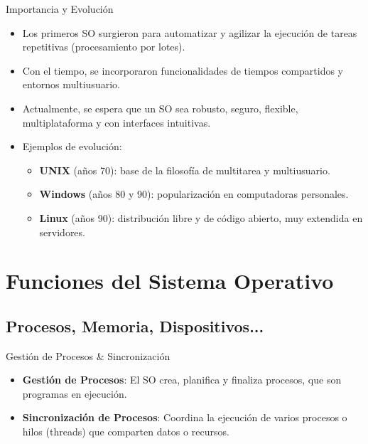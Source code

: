 \documentclass{beamer}
\begin{document}
\begin{frame}{Importancia y Evolución}
    \begin{itemize}
        \item Los primeros SO surgieron para automatizar y agilizar la ejecución de tareas repetitivas (procesamiento por lotes).
        \item Con el tiempo, se incorporaron funcionalidades de tiempos compartidos y entornos multiusuario.
        \item Actualmente, se espera que un SO sea robusto, seguro, flexible, multiplataforma y con interfaces intuitivas.
        \item Ejemplos de evolución:
        \begin{itemize}
            \item \textbf{UNIX} (años 70): base de la filosofía de multitarea y multiusuario.
            \item \textbf{Windows} (años 80 y 90): popularización en computadoras personales.
            \item \textbf{Linux} (años 90): distribución libre y de código abierto, muy extendida en servidores.
        \end{itemize}
    \end{itemize}
\end{frame}

\section{Funciones del Sistema Operativo}
\subsection{Procesos, Memoria, Dispositivos...}

\begin{frame}{Gestión de Procesos \& Sincronización}
    \begin{itemize}
        \item \textbf{Gestión de Procesos}: El SO crea, planifica y finaliza procesos, que son programas en ejecución.
        \item \textbf{Sincronización de Procesos}: Coordina la ejecución de varios procesos o hilos (threads) que comparten datos o recursos.
    \end{itemize}
\end{frame}
\end{document}
